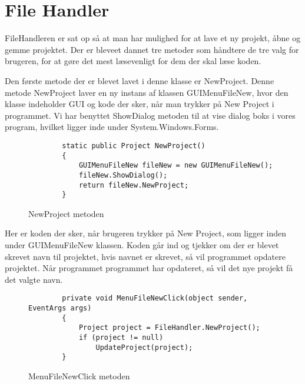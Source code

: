 \chapter{File Handler}\label{FileHandler}

FileHandleren er sat op så at man har mulighed for at lave et ny projekt, åbne og gemme projektet. Der er bleveet dannet tre metoder som håndtere de tre valg for brugeren, for at gøre det mest læsevenligt for dem der skal læse koden.

\vspace{5mm}

Den første metode der er blevet lavet i denne klasse er NewProject. Denne metode NewProject laver en ny instans af klassen GUIMenuFileNew, hvor den klasse indeholder GUI og kode der sker, når man trykker på New Project i programmet. Vi har benyttet ShowDialog metoden til at vise dialog boks i vores program, hvilket ligger inde under System.Windows.Forms.

\begin{figure}[H]
\begin{lstlisting}
 		static public Project NewProject()
        {
            GUIMenuFileNew fileNew = new GUIMenuFileNew();
            fileNew.ShowDialog();
            return fileNew.NewProject;
        }
\end{lstlisting}
\caption{NewProject metoden}\label{NewProjectCode}
\end{figure}

\vspace{5mm}

Her er koden der sker, når brugeren trykker på New Project, som ligger inden under GUIMenuFileNew klassen. Koden går ind og tjekker om der er blevet skrevet navn til projektet, hvis navnet er skrevet, så vil programmet opdatere projektet. Når programmet programmet har opdateret, så vil det nye projekt få det valgte navn.

\begin{figure}[H]
\begin{lstlisting}
        private void MenuFileNewClick(object sender, EventArgs args)
        {
            Project project = FileHandler.NewProject();
            if (project != null)
                UpdateProject(project);
        }
\end{lstlisting}
\caption{MenuFileNewClick metoden}\label{MenuFileNewClickCode}
\end{figure}

\vspace{5mm}

